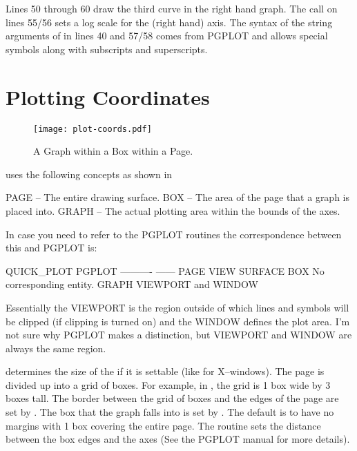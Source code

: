 Lines 50 through 60 draw the third curve in the right hand graph.  The
 call on lines 55/56 sets a log scale for the 
(right hand) axis. The syntax of the string arguments of
 in lines 40 and 57/58 comes from PGPLOT and allows
special symbols along with subscripts and superscripts.

\section{Plotting Coordinates}
\label{s:plot.coords}

\begin{figure}
  \centering
  \texttt{[image: plot-coords.pdf]}
  \caption{A Graph within a Box within a Page.}
  \label{f:plot.coords}
\end{figure}

\quickplot uses the following concepts as shown in 
\begin{example}
  PAGE  -- The entire drawing surface.
  BOX   -- The area of the page that a graph is placed into.
  GRAPH -- The actual plotting area within the bounds of the axes.
\end{example}
In case you need to refer to the PGPLOT routines the correspondence
between this and PGPLOT is:
\begin{example}
  QUICK_PLOT    PGPLOT
  ----------    ------
  PAGE          VIEW SURFACE
  BOX           No corresponding entity.
  GRAPH         VIEWPORT and WINDOW
\end{example}
Essentially the VIEWPORT is the region outside of which lines and symbols
will be clipped (if clipping is turned on) and the WINDOW defines the
plot area. I'm not sure why PGPLOT makes a distinction, but VIEWPORT and
WINDOW are always the same region.

 determines the size of the  if it is
settable (like for X--windows). The page is divided up into a grid of
boxes. For example, in , the grid is 1 box
wide by 3 boxes tall. The border between the grid of boxes and the
edges of the page are set by .  The box that
the graph falls into is set by . The default is to
have no margins with 1 box covering the entire page. The
 routine sets the distance between the box edges
and the axes (See the PGPLOT manual for more details).


